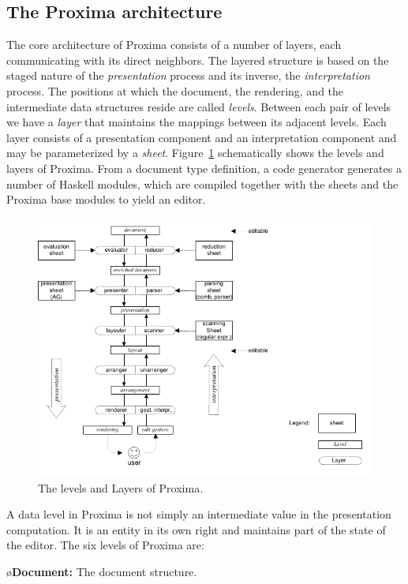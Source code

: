 \documentclass[10pt]{article}
\begin{document}
\subsection{The Proxima architecture}

The core architecture of Proxima consists of a number of layers, each communicating with its direct neighbors. The layered structure is based on the staged nature of the {\em presentation} process and its inverse, the {\em interpretation} process. The positions at which the document, the rendering, and the intermediate data structures reside are called {\em levels}. Between each pair of levels we have a {\em layer} that maintains the mappings between its adjacent levels. Each layer consists of a presentation component and an interpretation component and may be parameterized by a {\em sheet}. Figure~\ref{fig:levelsAndLayers} schematically shows the levels and layers of Proxima. From a document type definition, a code generator generates a number of Haskell modules, which are compiled together with the sheets and the Proxima base modules to yield an editor. 

\begin{figure}
\includegraphics[width=12cm]{images/LayerOverview}
\caption{The levels and Layers of Proxima.}
\label{fig:levelsAndLayers}
\end{figure}

A data level in Proxima is not simply an intermediate value in the presentation computation. It is an entity in its own right and maintains part of the state of the editor. The six levels of Proxima are:


\bl
\o {\bf Document:} The document structure.
\end{document}
